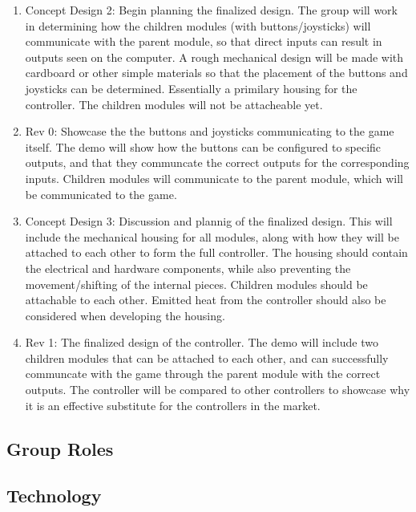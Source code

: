 \documentclass[a4]{article}
\begin{document}
\begin{enumerate}
    \item \textcolor{McMasterMaroon}{Concept Design 2}: Begin planning the finalized design. The group will work in determining how the children modules (with buttons/joysticks) will communicate with the parent module, so that direct inputs can result in outputs seen on the computer. A rough mechanical design will be made with cardboard or other simple materials so that the placement of the buttons and joysticks can be determined. Essentially a primilary housing for the controller. The children modules will not be attacheable yet.
    \item \textcolor{McMasterMaroon}{Rev 0}: Showcase the the buttons and joysticks communicating to the game itself. The demo will show how the buttons can be configured to specific outputs, and that they communcate the correct outputs for the corresponding inputs. Children modules will communicate to the parent module, which will be communicated to the game.
    \item \textcolor{McMasterMaroon}{Concept Design 3}: Discussion and plannig of the finalized design. This will include the mechanical housing for all modules, along with how they will be attached to each other to form the full controller. The housing should contain the electrical and hardware components, while also preventing the movement/shifting of the internal pieces. Children modules should be attachable to each other. Emitted heat from the controller should also be considered when developing the housing.
    \item \textcolor{McMasterMaroon}{Rev 1}: The finalized design of the controller. The demo will include two children modules that can be attached to each other, and can successfully communcate with the game through the parent module with the correct outputs. The controller will be compared to other controllers to showcase why it is an effective substitute for the controllers in the market. 
\end{enumerate}
\subsection{Group Roles}
\clearpage
\subsection{Technology}
\end{document}
